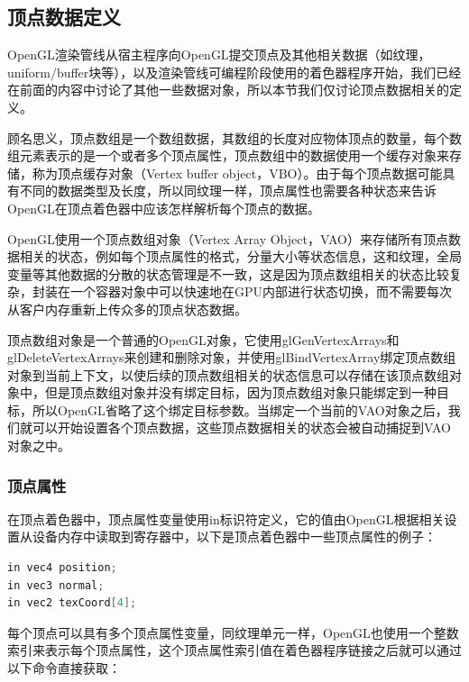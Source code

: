 \subsection{顶点数据定义}
OpenGL渲染管线从宿主程序向OpenGL提交顶点及其他相关数据（如纹理，uniform/buffer块等），以及渲染管线可编程阶段使用的着色器程序开始，我们已经在前面的内容中讨论了其他一些数据对象，所以本节我们仅讨论顶点数据相关的定义。

顾名思义，顶点数组是一个数组数据，其数组的长度对应物体顶点的数量，每个数组元素表示的是一个或者多个顶点属性，顶点数组中的数据使用一个缓存对象来存储，称为顶点缓存对象（Vertex buffer object，VBO）。由于每个顶点数据可能具有不同的数据类型及长度，所以同纹理一样，顶点属性也需要各种状态来告诉OpenGL在顶点着色器中应该怎样解析每个顶点的数据。

OpenGL使用一个顶点数组对象（Vertex Array Object，VAO）来存储所有顶点数据相关的状态，例如每个顶点属性的格式，分量大小等状态信息，这和纹理，全局变量等其他数据的分散的状态管理是不一致，这是因为顶点数组相关的状态比较复杂，封装在一个容器对象中可以快速地在GPU内部进行状态切换，而不需要每次从客户内存重新上传众多的顶点状态数据。

顶点数组对象是一个普通的OpenGL对象，它使用glGenVertexArrays和glDeleteVertexArrays来创建和删除对象，并使用glBindVertexArray绑定顶点数组对象到当前上下文，以使后续的顶点数组相关的状态信息可以存储在该顶点数组对象中，但是顶点数组对象并没有绑定目标，因为顶点数组对象只能绑定到一种目标，所以OpenGL省略了这个绑定目标参数。当绑定一个当前的VAO对象之后，我们就可以开始设置各个顶点数据，这些顶点数据相关的状态会被自动捕捉到VAO对象之中。




\subsubsection{顶点属性}
在顶点着色器中，顶点属性变量使用in标识符定义，它的值由OpenGL根据相关设置从设备内存中读取到寄存器中，以下是顶点着色器中一些顶点属性的例子：

\begin{lstlisting}[language=C++]
in vec4 position;
in vec3 normal;
in vec2 texCoord[4];
\end{lstlisting}

每个顶点可以具有多个顶点属性变量，同纹理单元一样，OpenGL也使用一个整数索引来表示每个顶点属性，这个顶点属性索引值在着色器程序链接之后就可以通过以下命令直接获取：

